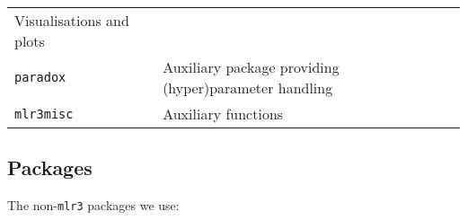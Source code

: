 \documentclass[]{article}
\begin{document}
\begin{longtable}[]{@{}ll@{}}
\begin{minipage}[t]{0.82\columnwidth}
Visualisations and plots\strut
\end{minipage}\tabularnewline
\begin{minipage}[t]{0.13\columnwidth}\raggedright
\texttt{paradox}\strut
\end{minipage} & \begin{minipage}[t]{0.82\columnwidth}\raggedright
Auxiliary package providing (hyper)parameter handling\strut
\end{minipage}\tabularnewline
\begin{minipage}[t]{0.13\columnwidth}\raggedright
\texttt{mlr3misc}\strut
\end{minipage} & \begin{minipage}[t]{0.82\columnwidth}\raggedright
Auxiliary functions\strut
\end{minipage}\tabularnewline
\bottomrule
\end{longtable}

\hypertarget{packages}{%
\subsection{Packages}\label{packages}}

The non-\texttt{mlr3} packages we use:
\end{document}
